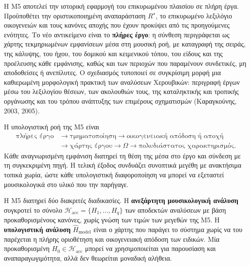 \documentclass[11pt,a4paper]{article}
\begin{document}
Η M5 αποτελεί την ιστορική εφαρμογή του επικυρωμένου πλαισίου σε πλήρη έργα. Προϋποθέτει την οριστικοποιημένη αναπαράσταση $R^\star$, το επικυρωμένο λεξιλόγιο οικογενειών και τους κανόνες αποχής που έχουν προκύψει από τις προηγούμενες ενότητες. Το νέο αντικείμενο είναι το \textbf{πλήρες έργο}: η σύνθεση περιγράφεται ως χάρτης τεκμηριωμένων εμφανίσεων μέσα στη μουσική ροή, με καταγραφή της σειράς, της κάλυψης, του ήχου, του δομικού και κειμενικού τόπου, του είδους και της προέλευσης κάθε εμφάνισης, καθώς και των περιοχών που παραμένουν συνδετικές, μη αποδοθείσες ή ανεπίλυτες. Ο σχεδιασμός τυποποιεί σε συγκρίσιμη μορφή μια καθιερωμένη μορφολογική πρακτική των αναλύσεων Χερουβικών: περιγραφή έργων μέσω του λεξιλογίου θέσεων, των ακολουθιών τους, της καταληκτικής και τροπικής οργάνωσης και του τρόπου ανάπτυξης των επιμέρους σχηματισμών (Καραγκούνης, 2003, 2005).

Η υπολογιστική ροή της M5 είναι
\[
\begin{aligned}
\text{πλήρες έργο}
&\rightarrow \text{τμηματοποίηση}
\rightarrow \text{οικογενειακή απόδοση ή αποχή}\\
&\rightarrow \text{χάρτης έργου}
\rightarrow \Omega
\rightarrow \text{πολυδιάστατος χαρακτηρισμός}.
\end{aligned}
\]
Κάθε αναγνωρισμένη εμφάνιση διατηρεί τη θέση της μέσα στο έργο και σύνδεση με τη συγκεκριμένη πηγή. Η τελική έξοδος συνδυάζει συνοπτικά μεγέθη με ανακτήσιμα τοπικά χωρία, ώστε κάθε υπολογιστική διαφοροποίηση να μπορεί να εξεταστεί μουσικολογικά στο υλικό που την παρήγαγε.

Η M5 διατηρεί δύο διακριτές διαδικασίες. Η \textbf{ανεξάρτητη μουσικολογική ανάλυση} συγκροτεί το σύνολο $\mathcal H_{\mathrm{acc}}=\{H_1,\ldots,H_q\}$ των αποδεκτών αναλύσεων με βάση προκαθορισμένους κανόνες, χωρίς γνώση των τιμών των μεγεθών της M5. Η \textbf{υπολογιστική ανάλυση} $\widehat H_{\mathrm{model}}$ είναι ο χάρτης που παράγει το σύστημα χωρίς να του παρέχεται η πλήρης οριοθέτηση και οικογενειακή απόδοση των ειδικών. Μία προκαθορισμένη $H_0\in\mathcal H_{\mathrm{acc}}$ μπορεί να χρησιμοποιείται για παρουσίαση και αναπαραγωγιμότητα, αλλά δεν θεωρείται μοναδική αλήθεια.
\end{document}
